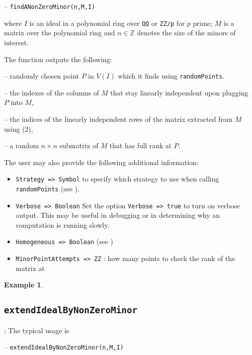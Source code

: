 \documentclass[11pt]{amsart}
\theoremstyle{definition}
\newtheorem{example}{Example}[section]
\begin{document}
	\vspace{1em}
	-- {\tt findANonZeroMinor(n,M,I)} 
	
	\vspace{1em}
	\noindent where $I$ is an ideal
	in a polynomial ring over {\tt QQ} or {\tt ZZ/p} for $p$ prime; $M$ is a matrix
	over the polynomial ring and $n\in \mathbb{Z}$ denotes the size of the minors of interest.
	
	The function outputs the following:
	
	-- randomly chosen point $P$ in $V(I)$ which it finds using {\tt randomPoints}.
	
	-- the indexes of the columns of $M$ that stay linearly independent upon plugging $P$ into $M$, 
	
	-- the indices of the linearly independent rows of the matrix extracted from $M$ using (2), 
	
	-- a random $n\times n$ submatrix of $M$ that has full rank at $P$.
	
The user may also provide the following additional information: 

\begin{itemize}
	\item {\tt Strategy => Symbol} to specify which strategy to use when calling {\tt randomPoints} (see ).
	
	\item {\tt Verbose => Boolean}
		 Set the option {\tt Verbose => true} to turn on verbose output.  This may be useful in debugging or in determining why an computation is running slowly.
		 
	\item {\tt Homogeneous => Boolean} (see )
	
	\item {\tt MinorPointAttempts => ZZ} :
	how many points to check the rank of the matrix at
\end{itemize}

\begin{example}
	
\end{example}

\subsection{\tt extendIdealByNonZeroMinor}\label{extendIdealByNonZeroMinor}: The typical usage is 

\vspace{1em}
-- {\tt extendIdealByNonZeroMinor(n,M,I)} 
\end{document}

